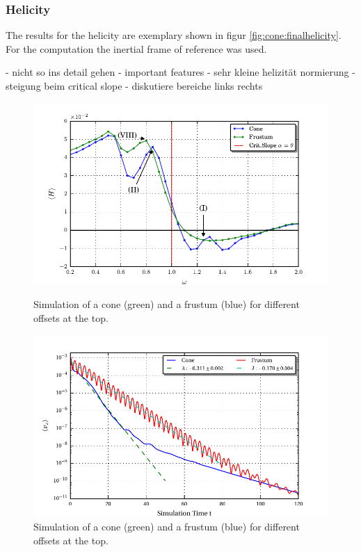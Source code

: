 \subsubsection{Helicity}

The results for  the helicity are exemplary shown in figur \ref{fig:cone:finalhelicity}.
For the computation the inertial frame of reference was used.

- nicht so ins detail gehen
- important features
- sehr kleine helizität normierung
- steigung beim critical slope
- diskutiere bereiche links rechts

\clearpage
\begin{figure}[!pt]
  \centering
  \includegraphics{gfx/cone/final/helicity.pdf}
  \caption{
      \label{fig:cone:finalhelicity}
    Simulation of a cone (green) and a frustum (blue) for different offsets at the
    top.
    }
  \centering
  \includegraphics{gfx/cone/final/decay/decay_example.pdf}
  \caption{
      \label{fig:cone:finaldecayexample}
    Simulation of a cone (green) and a frustum (blue) for different offsets at the
    top.
    }
\end{figure}

